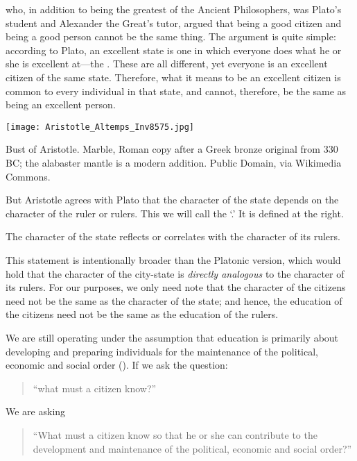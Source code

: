  who, in addition to being the greatest of the Ancient Philosophers, was Plato's student and Alexander the Great's tutor, argued that being a good citizen and being a good person cannot be the same thing. The argument is quite simple: according to Plato, an excellent state is one in which everyone does what he or she is excellent at---the . These are all different, yet everyone is an excellent citizen of the same state. Therefore, what it means to be an excellent citizen is common to every individual in that state, and cannot, therefore, be the same as being an excellent person. \begin{marginfigure}\texttt{[image: Aristotle\_Altemps\_Inv8575.jpg]}\caption{Bust of Aristotle. Marble, Roman copy after a Greek bronze original from 330 BC; the alabaster mantle is a modern addition. Public Domain, via Wikimedia Commons.}\label{fig:aristotle}\end{marginfigure}

But Aristotle agrees with Plato that the character of the state depends on the character of the ruler or rulers. This we will call the `.' It is defined at the right. 
\begin{thesis}\label{eq:constitution}
The character of the state reflects or correlates with the character of its rulers.\end{thesis}

This statement is intentionally broader than the Platonic version, which would hold that the character of the city-state is \emph{directly analogous} to the character of its rulers. For our purposes, we only need note that the character of the citizens need not be the same as the character of the state; and hence, the education of the citizens need not be the same as the education of the rulers.

We are still operating under the assumption that education is primarily about developing and preparing individuals for the maintenance of the political, economic and social order (). If we ask the question:

\begin{quote}

``what must a citizen know?''
\end{quote}

We are asking 

\begin{quote}

``What must a citizen know so that he or she can contribute to the development and maintenance of the political, economic and social order?''
\end{quote}

